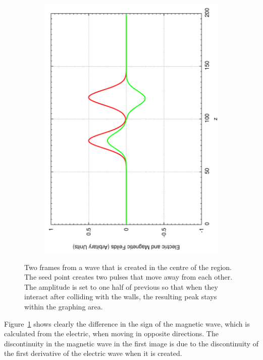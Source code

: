 \begin{figure}[ht]
\begin{subfigure}[ht]{0.45\textwidth}
                \includegraphics[angle=270, width=\textwidth]{centerseed2.pdf}
        \end{subfigure}
        \caption{Two frames from a wave that is created in the centre of the region. The seed point creates two pulses that move away from each other. The amplitude is set to one half of previous so that when they interact after colliding with the walls, the resulting peak stays within the graphing area.}\label{fig:initialcenter}
\end{figure}

Figure~\ref{fig:initialcenter} shows clearly the difference in the sign of the magnetic wave, which is calculated from the electric, when moving in opposite directions. The discontinuity in the magnetic wave in the first image is due to the discontinuity of the first derivative of the electric wave when it is created. 

